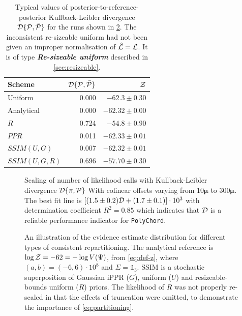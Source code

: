 \documentclass[usenatbib]{mnras}
\begin{document}
\begin{table}
  \centering
  
  \caption{Typical values of posterior-to-reference-posterior
    Kullback-Leibler divergence ${\cal D}\{{\cal P}, \bar{\cal P}\}$
    for the runs shown in \cref{fig:hist}. The inconsistent
    re-sizeable uniform had not been given an improper normalisation
    of $\hat{\cal L} = {\cal L}$. It is of type \textbf{\emph{Re-sizeable
      uniform}} described in \cref{sec:resizeable}.}
  \begin{tabular}{lrr}
    \textbf{Scheme} & ${\cal D}\{ {\cal P}, \bar{\cal P}\}$ & ${\cal Z}$\\
    \hline
    Uniform & 0.000 & \(-62.3 \pm 0.30\)\\
    Analytical & 0.000 & \(-62.32 \pm 0.00\) \\
    $R$ & 0.724 & \(-54.8 \pm 0.90\)\\
    $PPR$ & 0.011 & \(-62.33 \pm 0.01\)\\
    $SSIM(U, G)$ & 0.007 & \(-62.32 \pm 0.01\)\\
    $SSIM(U, G, R)$ & 0.696 & \(-57.70 \pm 0.30\)\\
  \end{tabular}
  \label{tab:hist}
\end{table}


\begin{figure}
  
  \caption{Scaling of number of likelihood calls with Kullback-Leibler
    divergence \({\cal D}\{ \pi, {\cal P}\}\) With colinear offsets
    varying from $10\bm{\mu}$ to $300\bm{\mu}$. The best fit line is
    \(\left[(1.5 \pm 0.2) {\cal D} + (1.7 \pm 0.1)\right]\cdot 10^3 \)
    with determination coefficient \(R^{2} = 0.85\) which indicates
    that \({\cal D}\) is a reliable performance indicator for
    \texttt{PolyChord}.\label{fig:kl-scaling}}
\end{figure}


\begin{figure}

\caption{An illustration of the evidence estimate distribution for
  different types of consistent repartitioning. The analytical
  reference is \(\log {\cal Z} = -62 = - \log V(\Psi)\), from
  \cref{eq:def-z}, where \((a,b)=(-6, 6)\cdot 10^{8}\) and
  \(\Sigma=\mathds{1}_{3}\). SSIM is a stochastic superposition of
  Gaussian iPPR (\(G\)), uniform (\(U\)) and resizeable-bounds uniform
  (\(R\)) priors. The likelihood of \(R\) was not properly re-scaled
  in that the effects of truncation were omitted, to demonstrate the
  importance of \cref{eq:partitioning}. \label{fig:hist}}
\end{figure}
\end{document}
